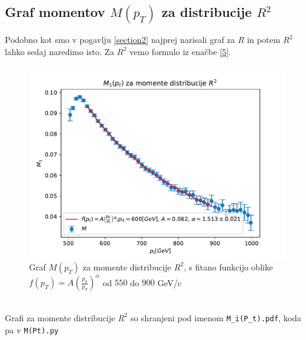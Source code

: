 \subsection{Graf momentov $M(p_T)$ za distribucije $R^2$}
Podobno kot smo v pogavlju \ref{section2} najprej narisali graf 
za $R$ in potem $R^2$ lahko sedaj naredimo isto. Za $R^2$ vemo formulo iz enačbe \eqref{5}.
\begin{figure}[h]
    \begin{center}
        \includegraphics[width=13cm]{sections/section3/figures/M_1(P_t).pdf}
        \caption{Graf $M(p_T)$ za momente distribucije $R^2$, s fitano funkcijo oblike $f(p_T) = A\left(\frac{p_0}{p_T}\right)^\alpha$ od $550$ do $900$ GeV/c}
        \label{slika 5}
    \end{center}
\end{figure}
\\
Grafi za momente distribucije $R^2$ so shranjeni pod imenom \verb|M_i(P_t).pdf|, koda pa v
\verb|M(Pt).py|